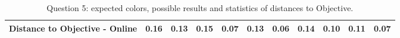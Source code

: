 \begin{table}[H]
{\begin{tabular}{lccccccccccccc}
    \multicolumn{4}{l}{Distance to Objective - Online}                                                                                               & \multicolumn{1}{|c}{0.16}        & \multicolumn{1}{c|}{0.13}    & \multicolumn{1}{|c}{0.15}        & \multicolumn{1}{c|}{0.07}    & \multicolumn{1}{|c}{\textbf{0.13}}       & \multicolumn{1}{c|}{0.06}    & \multicolumn{1}{|c}{0.14}        & \multicolumn{1}{c|}{0.10}    & \multicolumn{1}{|c}{0.11}       & \multicolumn{1}{c|}{0.07}    \\ \hline
    \end{tabular}}
  \caption[Question 5, with expected Results.]{Question 5: expected colors, possible results and statistics of distances to Objective.}
  \vspace{-5pt}
  \label{table:lab_q5_expected}
\end{table}
%
